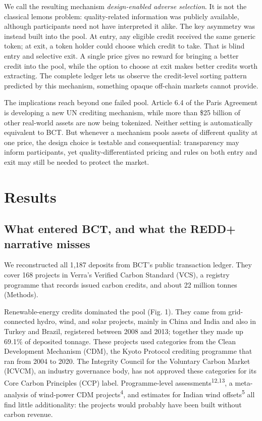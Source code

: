 \documentclass[sn-nature,Numbered]{sn-jnl}
\begin{document}
We call the resulting mechanism \textit{design-enabled adverse selection}. It is not the classical lemons problem: quality-related information was publicly available, although participants need not have interpreted it alike. The key asymmetry was instead built into the pool. At entry, any eligible credit received the same generic token; at exit, a token holder could choose which credit to take. That is blind entry and selective exit. A single price gives no reward for bringing a better credit into the pool, while the option to choose at exit makes better credits worth extracting. The complete ledger lets us observe the credit-level sorting pattern predicted by this mechanism, something opaque off-chain markets cannot provide.

The implications reach beyond one failed pool. Article 6.4 of the Paris Agreement is developing a new UN crediting mechanism, while more than \$25 billion of other real-world assets are now being tokenized. Neither setting is automatically equivalent to BCT. But whenever a mechanism pools assets of different quality at one price, the design choice is testable and consequential: transparency may inform participants, yet quality-differentiated pricing and rules on both entry and exit may still be needed to protect the market.

\section*{Results}
\subsection*{What entered BCT, and what the REDD+ narrative misses}

We reconstructed all 1,187 deposits from BCT's public transaction ledger. They cover 168 projects in Verra's Verified Carbon Standard (VCS), a registry programme that records issued carbon credits, and about 22 million tonnes (Methods).

Renewable-energy credits dominated the pool (Fig. 1). They came from grid-connected hydro, wind, and solar projects, mainly in China and India and also in Turkey and Brazil, registered between 2008 and 2013; together they made up 69.1\% of deposited tonnage. These projects used categories from the Clean Development Mechanism (CDM), the Kyoto Protocol crediting programme that ran from 2004 to 2020. The Integrity Council for the Voluntary Carbon Market (ICVCM), an industry governance body, has not approved these categories for its Core Carbon Principles (CCP) label. Programme-level assessments\textsuperscript{12,13}, a meta-analysis of wind-power CDM projects\textsuperscript{4}, and estimates for Indian wind offsets\textsuperscript{5} all find little additionality: the projects would probably have been built without carbon revenue.
\end{document}
